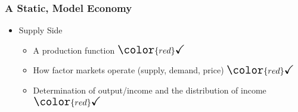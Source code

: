 \documentclass[handout]{beamer}
\begin{document}

\begin{frame}[t]
\frametitle{A Static, Model Economy}
\bigskip
\begin{itemize}
\item Supply Side
\begin{itemize}
\medskip
\item A production function $\Large {\color{red}\checkmark}$
\medskip
\item How factor markets operate (supply, demand, price) $\Large {\color{red}\checkmark}$
\medskip
\item Determination of output/income and the distribution of income $\Large {\color{red}\checkmark}$
\end{itemize}
\end{itemize}
\bigskip
\end{frame}
\end{document}

